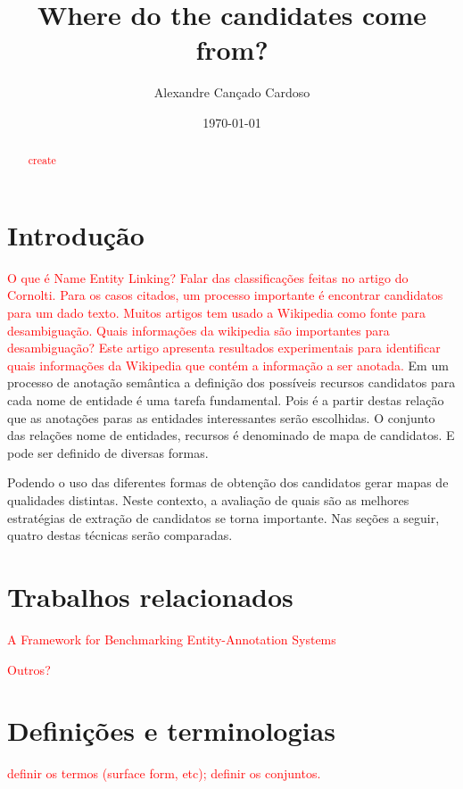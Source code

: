 \documentclass[10pt,a4paper]{llncs}
\title{Where do the candidates come from?}
\author{Alexandre Cançado Cardoso}
\institute{UFJF}
\date{\today}
\begin{document}
\maketitle

 \begin{abstract}
    \textcolor{red}{create}
 \end{abstract}

\section{Introdução} \label{introducao}

\textcolor{red}{O que é Name Entity Linking? Falar das classificações feitas no artigo do Cornolti. Para os casos citados, um processo importante é encontrar candidatos para um dado texto. Muitos artigos tem usado a Wikipedia como fonte para desambiguação. Quais informações da wikipedia são importantes para desambiguação? Este artigo apresenta resultados experimentais para identificar quais informações da Wikipedia que contém a informação a ser anotada.}
 Em um processo de anotação semântica a definição dos possíveis recursos candidatos para cada nome de entidade é uma tarefa fundamental. Pois é a partir destas relação que as anotações paras as entidades interessantes serão escolhidas. O conjunto das relações nome de entidades, recursos é denominado de mapa de candidatos. E pode ser definido de diversas formas.

Podendo o uso das diferentes formas de obtenção dos candidatos gerar mapas de qualidades distintas. Neste contexto, a avaliação de quais são as melhores estratégias de extração de candidatos se torna importante. Nas seções a seguir, quatro destas técnicas serão comparadas.



\section{Trabalhos relacionados}\label{related}
\textcolor{red}{A Framework for Benchmarking Entity-Annotation Systems}

\textcolor{red}{Outros?}



\section{Definições e terminologias}
\textcolor{red}{definir os termos (surface form, etc); definir os conjuntos.}
\end{document}
